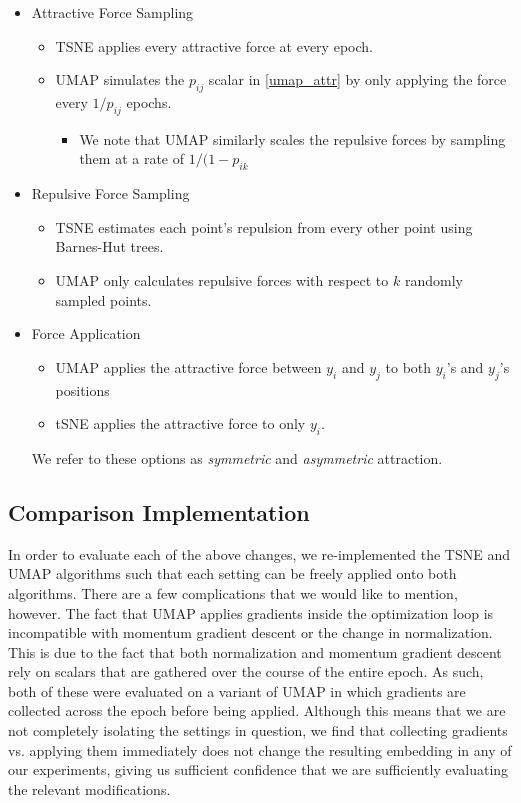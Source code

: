 \documentclass[sigconf, nonacm]{acmart}
\begin{document}
\begin{itemize}
    \item Attractive Force Sampling
        \begin{itemize}
        \item TSNE applies every attractive force at every epoch.
        \item UMAP simulates the $p_{ij}$ scalar in \ref{umap_attr} by only applying the force every $1 / p_{ij}$ epochs.
            \begin{itemize}
                \item We note that UMAP similarly scales the repulsive forces by sampling them at a rate of $1 / (1 - p_{ik}$
            \end{itemize}
        \end{itemize}

    \item Repulsive Force Sampling
        \begin{itemize}
        \item TSNE estimates each point's repulsion from every other point using Barnes-Hut trees.
        \item UMAP only calculates repulsive forces with respect to $k$ randomly sampled points.
        \end{itemize}

    \item Force Application
        \begin{itemize}
        \item UMAP applies the attractive force between $y_i$ and $y_j$ to both $y_i$'s and $y_j$'s positions
        \item tSNE applies the attractive force to only $y_i$.
        \end{itemize}
        We refer to these options as \textit{symmetric} and \textit{asymmetric} attraction.

\end{itemize}

\subsection{Comparison Implementation}
In order to evaluate each of the above changes, we re-implemented the TSNE and UMAP algorithms such that each setting can be freely applied onto both algorithms.
There are a few complications that we would like to mention, however. The fact that UMAP applies gradients inside the optimization loop is incompatible
with momentum gradient descent or the change in normalization. This is due to the fact that both normalization and momentum gradient
descent rely on scalars that are gathered over the course of the entire epoch. As such, both of these were evaluated on a variant of UMAP in which gradients are
collected across the epoch before being applied. Although this means that we are not completely isolating the settings in question, we find that collecting
gradients vs. applying them immediately does not change the resulting embedding in any of our experiments, giving us sufficient confidence that we are
sufficiently evaluating the relevant modifications.
\end{document}
